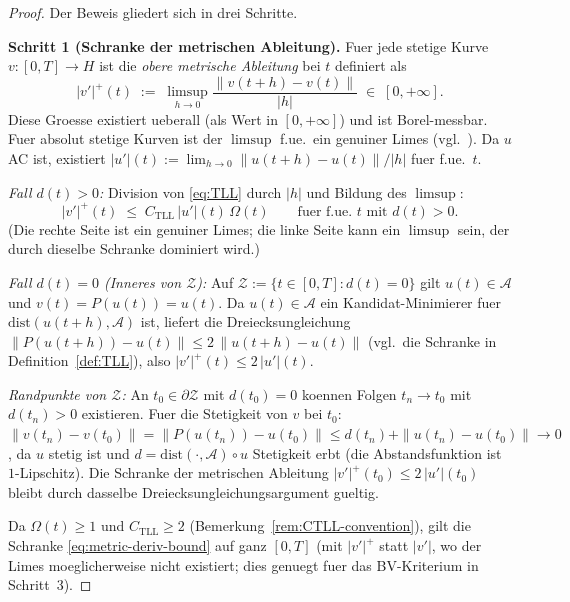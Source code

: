 \documentclass[12pt,a4paper]{article}
\theoremstyle{definition}
\theoremstyle{plain}
\theoremstyle{remark}
\newcommand{\dist}{\mathrm{dist}}
\begin{document}
\begin{proof}
Der Beweis gliedert sich in drei Schritte.

\medskip
\noindent
\textbf{Schritt 1 (Schranke der metrischen Ableitung).}\;
Fuer jede stetige Kurve $v: [0,T] \to H$ ist die \emph{obere
metrische Ableitung} bei $t$ definiert als
\[
  |v'|^+(t)
  \;:=\;
  \limsup_{h \to 0} \frac{\|v(t+h) - v(t)\|}{|h|}
  \;\in\; [0,+\infty].
\]
Diese Groesse existiert ueberall (als Wert in $[0,+\infty]$)
und ist Borel-messbar.  Fuer absolut stetige Kurven ist der
$\limsup$ f.ue.\ ein genuiner Limes
(vgl.~\cite[Theorem~1.1.2]{AmbrosioGigliSavare2008}).
Da $u$ AC ist, existiert $|u'|(t) := \lim_{h\to 0}\|u(t+h)-u(t)\|/|h|$
fuer f.ue.~$t$.

\smallskip\noindent
\emph{Fall $d(t)>0$:}\;
Division von \eqref{eq:TLL} durch $|h|$ und Bildung des $\limsup$:
\begin{equation}\label{eq:metric-deriv-bound}
  |v'|^+(t)
  \;\le\;
  C_{\mathrm{TLL}}\,|u'|(t)\,\Omega(t)
  \qquad \text{fuer f.ue.\ } t \text{ mit } d(t) > 0.
\end{equation}
(Die rechte Seite ist ein genuiner Limes; die linke Seite kann
ein $\limsup$ sein, der durch dieselbe Schranke dominiert wird.)

\smallskip\noindent
\emph{Fall $d(t)=0$ (Inneres von $\mathcal{Z}$):}\;
Auf $\mathcal{Z} := \{t \in [0,T] : d(t) = 0\}$ gilt
$u(t) \in \mathcal{A}$ und $v(t) = P(u(t)) = u(t)$.
Da $u(t) \in \mathcal{A}$ ein Kandidat-Minimierer fuer
$\dist(u(t+h), \mathcal{A})$ ist, liefert die
Dreiecksungleichung
$\|P(u(t+h)) - u(t)\| \le 2\,\|u(t+h) - u(t)\|$
(vgl.\ die Schranke in Definition~\ref{def:TLL}),
also $|v'|^+(t) \le 2\,|u'|(t)$.

\smallskip\noindent
\emph{Randpunkte von $\mathcal{Z}$:}\;
An $t_0 \in \partial\mathcal{Z}$ mit $d(t_0)=0$ koennen Folgen
$t_n \to t_0$ mit $d(t_n) > 0$ existieren.  Fuer die Stetigkeit von
$v$ bei $t_0$: $\|v(t_n) - v(t_0)\| = \|P(u(t_n)) - u(t_0)\|
\le d(t_n) + \|u(t_n) - u(t_0)\| \to 0$, da $u$
stetig ist und $d = \dist(\cdot,\mathcal{A}) \circ u$ Stetigkeit
erbt (die Abstandsfunktion ist $1$-Lipschitz).  Die Schranke der metrischen Ableitung
$|v'|^+(t_0) \le 2\,|u'|(t_0)$ bleibt durch dasselbe
Dreiecksungleichungsargument gueltig.

\smallskip\noindent
Da $\Omega(t) \ge 1$ und $C_{\mathrm{TLL}} \ge 2$
(Bemerkung~\ref{rem:CTLL-convention}), gilt die
Schranke \eqref{eq:metric-deriv-bound} auf ganz $[0,T]$
(mit $|v'|^+$ statt $|v'|$, wo der Limes moeglicherweise
nicht existiert; dies genuegt fuer das BV-Kriterium in Schritt~3).


\end{proof}
\end{document}
